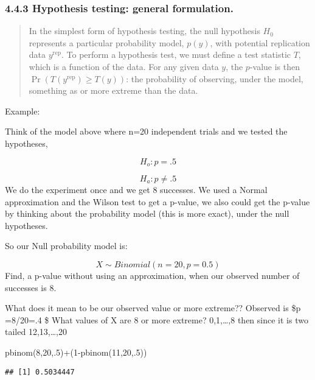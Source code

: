 \documentclass[
]{article}
\newenvironment{Shaded}{\begin{snugshade}}{\end{snugshade}}
\newcommand{\DecValTok}[1]{\textcolor[rgb]{0.00,0.00,0.81}{#1}}
\newcommand{\FunctionTok}[1]{\textcolor[rgb]{0.00,0.00,0.00}{#1}}
\newcommand{\NormalTok}[1]{#1}
\newcommand{\SpecialCharTok}[1]{\textcolor[rgb]{0.00,0.00,0.00}{#1}}
\begin{document}
\hypertarget{hypothesis-testing-general-formulation.}{%
\subsubsection{4.4.3 Hypothesis testing: general
formulation.}\label{hypothesis-testing-general-formulation.}}

\begin{quote}
In the simplest form of hypothesis testing, the null hypothesis \(H_0\)
represents a particular probability model, \(p(y)\), with potential
replication data \(y^\text{rep}\). To perform a hypothesis test, we must
define a test statistic \(T\), which is a function of the data. For any
given data \(y\), the \(p\)-value is then
\(\operatorname{Pr}(T(y^\text{rep}) \geq T(y))\): the probability of
observing, under the model, something as or more extreme than the data.
\end{quote}

Example:

Think of the model above where n=20 independent trials and we tested the
hypotheses,

\[H_o: p=.5\]

\[H_a: p \ne .5\] We do the experiment once and we get 8 successes. We
used a Normal approximation and the Wilson test to get a p-value, we
also could get the p-value by thinking about the probability model (this
is more exact), under the null hypotheses.

So our Null probability model is:

\[X \sim Binomial (n=20, p=0.5)\] Find, a p-value without using an
approximation, when our observed number of successes is 8.

What does it mean to be our observed value or more extreme?? Observed is
\$\hat p =8/20=.4 \$ What values of X are 8 or more extreme?
0,1,\ldots,8 then since it is two tailed 12,13,\ldots,20

\begin{Shaded}
\begin{Highlighting}[]
\FunctionTok{pbinom}\NormalTok{(}\DecValTok{8}\NormalTok{,}\DecValTok{20}\NormalTok{,.}\DecValTok{5}\NormalTok{)}\SpecialCharTok{+}\NormalTok{(}\DecValTok{1}\SpecialCharTok{{-}}\FunctionTok{pbinom}\NormalTok{(}\DecValTok{11}\NormalTok{,}\DecValTok{20}\NormalTok{,.}\DecValTok{5}\NormalTok{))}
\end{Highlighting}
\end{Shaded}

\begin{verbatim}
## [1] 0.5034447
\end{verbatim}
\end{document}
